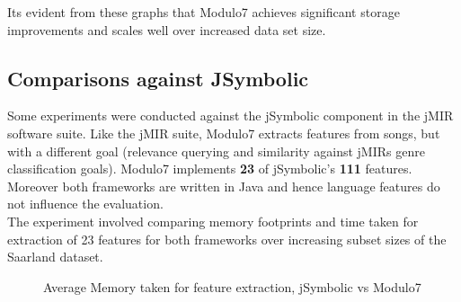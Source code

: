 \documentclass{article}
\begin{document}
\noindent Its evident from these graphs that Modulo7 achieves significant storage improvements and scales well over increased data set size.   

\subsection{Comparisons against JSymbolic}

Some experiments were conducted against the jSymbolic component in the jMIR \cite{jMIR} software suite. Like the jMIR suite, Modulo7 extracts features from songs, but with a different goal (relevance querying and similarity against jMIRs genre classification goals). Modulo7 implements \textbf{23} of jSymbolic's \textbf{111} features. Moreover both frameworks are written in Java and hence language features do not influence the evaluation. \\ 

\noindent The experiment involved comparing memory footprints and time taken for extraction of 23 features for both frameworks over increasing subset sizes of the Saarland \cite{saarlandmsd} dataset. 

\begin{figure}[h]
\begin{center}
{}
 \caption{Average Memory taken for feature extraction, jSymbolic vs Modulo7}
 \label{fig:MemoryTaken}
\end{center}
\end{figure}
\end{document}
